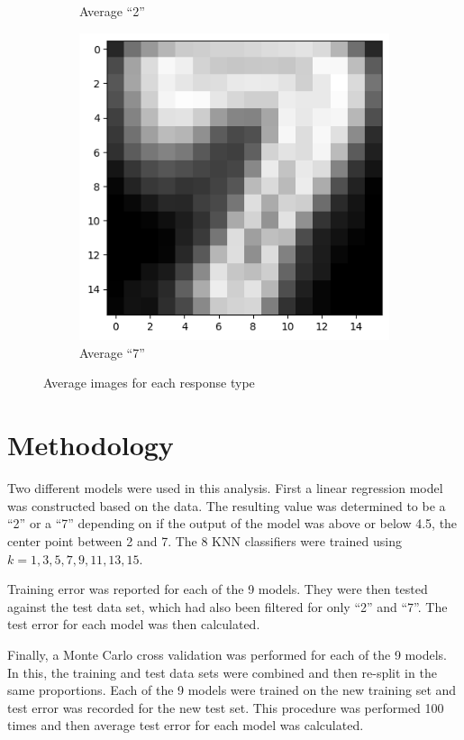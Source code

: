 \documentclass[12pt,letterpaper]{article}
\begin{document}
\begin{figure}[h]
\begin{subfigure}{0.3\textwidth}
    \caption{Average ``2''}
  \end{subfigure}
  \begin{subfigure}{0.3\textwidth}
    \includegraphics[width=\textwidth]{avg_7}
    \caption{Average ``7''}
  \end{subfigure}
  \caption{Average images for each response type}
  \label{fig:avg_image}
\end{figure}

\section*{Methodology}

Two different models were used in this analysis. First a linear regression model was constructed based on the data. The resulting value was determined to be a ``2'' or a ``7'' depending on if the output of the model was above or below 4.5, the center point between 2 and 7. The 8 KNN classifiers were trained using $k = {1, 3, 5, 7, 9, 11, 13, 15}$. 

Training error was reported for each of the 9 models. They were then tested against the test data set, which had also been filtered for only ``2'' and ``7''. The test error for each model was then calculated. 

Finally, a Monte Carlo cross validation was performed for each of the 9 models. In this, the training and test data sets were combined and then re-split in the same proportions. Each of the 9 models were trained on the new training set and test error was recorded for the new test set. This procedure was performed 100 times and then average test error for each model was calculated. 
\end{document}
